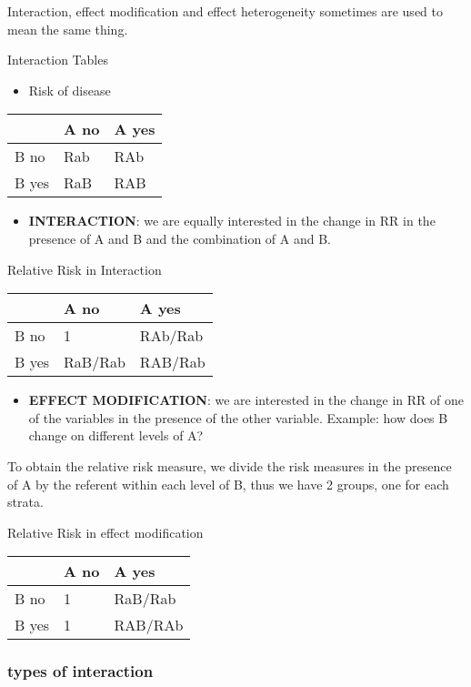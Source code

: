 \documentclass[
]{article}
\providecommand{\tightlist}{%
  \setlength{\itemsep}{0pt}\setlength{\parskip}{0pt}}
\begin{document}
Interaction, effect modification and effect heterogeneity sometimes are
used to mean the same thing.

Interaction Tables

\begin{itemize}
\tightlist
\item
  Risk of disease
\end{itemize}

\begin{longtable}[]{@{}lll@{}}
\toprule
& A no & A yes\tabularnewline
\midrule
\endhead
B no & Rab & RAb\tabularnewline
B yes & RaB & RAB\tabularnewline
\bottomrule
\end{longtable}

\begin{itemize}
\tightlist
\item
  \textbf{INTERACTION}: we are equally interested in the change in RR in
  the presence of A and B and the combination of A and B.
\end{itemize}

Relative Risk in Interaction

\begin{longtable}[]{@{}lll@{}}
\toprule
& A no & A yes\tabularnewline
\midrule
\endhead
B no & 1 & RAb/Rab\tabularnewline
B yes & RaB/Rab & RAB/Rab\tabularnewline
\bottomrule
\end{longtable}

\begin{itemize}
\tightlist
\item
  \textbf{EFFECT MODIFICATION}: we are interested in the change in RR of
  one of the variables in the presence of the other variable. Example:
  how does B change on different levels of A?
\end{itemize}

To obtain the relative risk measure, we divide the risk measures in the
presence of A by the referent within each level of B, thus we have 2
groups, one for each strata.

Relative Risk in effect modification

\begin{longtable}[]{@{}lll@{}}
\toprule
& A no & A yes\tabularnewline
\midrule
\endhead
B no & 1 & RaB/Rab\tabularnewline
B yes & 1 & RAB/RAb\tabularnewline
\bottomrule
\end{longtable}

\hypertarget{types-of-interaction}{%
\subsubsection{types of interaction}\label{types-of-interaction}}
\end{document}
